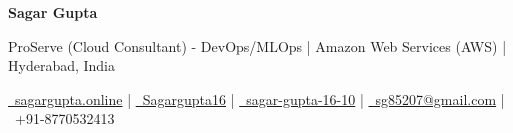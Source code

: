 \begin{center}
    \LARGE{\textbf{Sagar Gupta}}
\end{center}
\vspace{-3mm}
\begin{center}
    \small{ProServe (Cloud Consultant) - DevOps/MLOps \hspace{1mm}|\hspace{1mm} Amazon Web Services (AWS) \hspace{1mm}|\hspace{1mm} Hyderabad, India}
\end{center}
\vspace{-2mm}
\begin{center}
    \small{%
    \href{https://sagargupta.online/portfolio-react/}{\faGlobe\ sagargupta.online} \hspace{1mm}|
    \hspace{1mm} \href{https://github.com/Sagargupta16}{\faGithub\ Sagargupta16} \hspace{1mm}|
    \hspace{1mm} \href{https://www.linkedin.com/in/sagar-gupta-16-10/}{\faLinkedinSquare\ sagar-gupta-16-10} \hspace{1mm}|
    \hspace{1mm} \href{mailto:sg85207@gmail.com}{\faEnvelope\ sg85207@gmail.com} \hspace{1mm}|
    \hspace{1mm} \faPhone\ +91-8770532413}
\end{center}
\vspace{-2mm}
